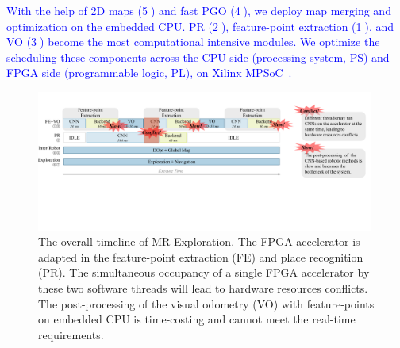 \textcolor{blue}{
With the help of 2D maps (\textcircled{5}) and fast PGO (\textcircled{4}), we deploy map merging and optimization on the embedded CPU. 
PR (\textcircled{2}), feature-point extraction (\textcircled{1}), and VO (\textcircled{3}) become the most computational intensive modules. We optimize the scheduling these components across the CPU side (processing system, PS) and FPGA side (programmable logic, PL), on Xilinx MPSoC~\cite{MPSoC}.
}







\begin{figure}[t]
 \centering
 \includegraphics[width=0.99\textwidth]{fig/overalltime.pdf} 	
 \vspace{-2mm}
 \caption{
 The overall timeline of MR-Exploration. The FPGA accelerator is adapted in the feature-point extraction (FE) and place recognition (PR). The simultaneous occupancy of a single FPGA accelerator by these two software threads will lead to hardware resources conflicts. The post-processing of the visual odometry (VO) with feature-points on embedded CPU is time-costing and cannot meet the real-time requirements.
 }
	\label{fig:overalltime}
\end{figure}

